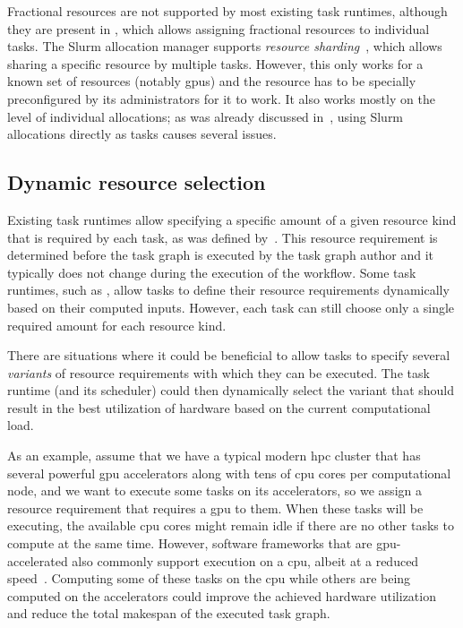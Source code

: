 Fractional resources are not supported by most existing task runtimes, although they are present in
\ray{}, which allows assigning fractional resources to individual tasks. The Slurm
allocation manager supports \emph{resource sharding}~\cite{slurm-sharding}, which allows sharing a
specific resource by multiple tasks. However, this only works for a known set of resources (notably
\glspl{gpu}) and the resource has to be specially preconfigured by its administrators
for it to work. It also works mostly on the level of individual allocations; as was already
discussed in~, using Slurm allocations directly as tasks causes several
issues.

\subsection{Dynamic resource selection}
\label{sec:dynamic-resource-selection}
Existing task runtimes allow specifying a specific amount of a given resource kind that is required
by each task, as was defined by~. This resource requirement is determined
before the task graph is executed by the task graph author and it typically does not change during
the execution of the workflow. Some task runtimes, such as \snakemake{}, allow tasks to
define their resource requirements dynamically based on their computed inputs. However, each task
can still choose only a single required amount for each resource kind.

There are situations where it could be beneficial to allow tasks to specify several
\emph{variants} of resource requirements with which they can be executed. The task runtime
(and its scheduler) could then dynamically select the variant that should result in the best
utilization of hardware based on the current computational load.

As an example, assume that we have a typical modern \gls{hpc} cluster that has
several powerful \gls{gpu} accelerators along with tens of \gls{cpu}
cores per computational node, and we want to execute some tasks on its accelerators, so we assign a
resource requirement that requires a \gls{gpu} to them. When these tasks will be
executing, the available \gls{cpu} cores might remain idle if there are no other
tasks to compute at the same time. However, software frameworks that are
\gls{gpu}-accelerated also commonly support execution on a \gls{cpu},
albeit at a reduced speed~\cite{gromacs,tensorflow}. Computing some of these tasks on the
\gls{cpu} while others are being computed on the accelerators could improve the
achieved hardware utilization and reduce the total makespan of the executed task graph.

